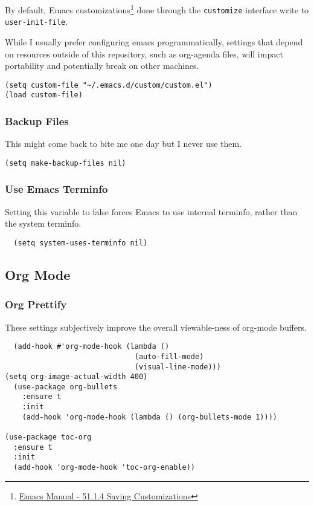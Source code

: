 \documentclass[11pt]{article}
\begin{document}
By default, Emacs customizations\footnote{\href{https://www.gnu.org/software/emacs/manual/html\_node/emacs/Saving-Customizations.html}{Emacs Manual - 51.1.4 Saving Customizations}} done through the \texttt{customize}
interface write to \texttt{user-init-file}.

While I usually prefer configuring emacs programmatically, settings
that depend on resources outside of this repository, such as
org-agenda files, will impact portability and potentially break on
other machines.

\begin{verbatim}
(setq custom-file "~/.emacs.d/custom/custom.el")
(load custom-file)
\end{verbatim}

\subsubsection*{Backup Files}
\label{sec:org063da41}

This might come back to bite me one day but I never use them.

\begin{verbatim}
(setq make-backup-files nil)
\end{verbatim}

\subsubsection*{Use Emacs Terminfo}
\label{sec:orgdcfcc9b}
Setting this variable to false forces Emacs to use internal terminfo,
rather than the system terminfo.

\begin{verbatim}
  (setq system-uses-terminfo nil)
\end{verbatim}

\subsection*{Org Mode}
\label{sec:org8728288}

\subsubsection*{Org Prettify}
\label{sec:org634f915}

These settings subjectively improve the overall viewable-ness of
org-mode buffers.

\begin{verbatim}
  (add-hook #'org-mode-hook (lambda ()
                              (auto-fill-mode)
                              (visual-line-mode)))
(setq org-image-actual-width 400)
  (use-package org-bullets
    :ensure t
    :init
    (add-hook 'org-mode-hook (lambda () (org-bullets-mode 1))))

(use-package toc-org
  :ensure t
  :init
  (add-hook 'org-mode-hook 'toc-org-enable))
\end{verbatim}
\end{document}
